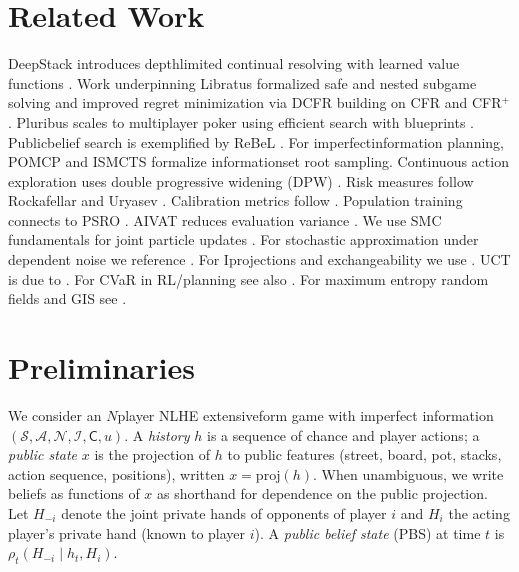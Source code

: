 \documentclass[10pt]{article}
\newcommand{\States}{\mathcal{S}}
\newcommand{\Actions}{\mathcal{A}}
\newcommand{\IS}{\mathcal{I}}
\newcommand{\Players}{\mathcal{N}}
\newcommand{\Chance}{\mathsf{C}}
\newcommand{\1}{\mathbf{1}}
\theoremstyle{plain}
\begin{document}
\section{Related Work}
DeepStack introduces depth\textendash limited continual re\textendash solving with learned value functions \citep{moravcik2017deepstack}. Work underpinning Libratus formalized safe and nested subgame solving \citep{brown2018safe} and improved regret minimization via DCFR \citep{brown2019dcfr} building on CFR \citep{zinkevich2007cfr} and CFR$^+$ \citep{tammelin2014cfrplus}. Pluribus scales to multiplayer poker using efficient search with blueprints \citep{brown2019pluribus}. Public\textendash belief search is exemplified by ReBeL \citep{brown2020rebel}. For imperfect\textendash information planning, POMCP \citep{silver2010pomcp} and ISMCTS \citep{cowling2012ismcts} formalize information\textendash set root sampling. Continuous action exploration uses double progressive widening (DPW) \citep{couetoux2011dpw}. Risk measures follow Rockafellar and Uryasev \citep{rockafellar2000cvar}. Calibration metrics follow \citet{guo2017calibration}. Population training connects to PSRO \citep{lanctot2017psro}. AIVAT reduces evaluation variance \citep{burch2018aivat}. We use SMC fundamentals for joint particle updates \citep{doucet2001smc}. For stochastic approximation under dependent noise we reference \citet{borkar2008sa}. For I\textendash projections and exchangeability we use \citet{csiszar1975i,diaconis1980finite}. UCT is due to \citet{kocsis2006uct}. For CVaR in RL/planning see also \citet{chow2014cvar,tamar2015cvar}. For maximum entropy random fields and GIS see \citet{dellarfield1997pami}.

\section{Preliminaries}
We consider an $N$\textendash player NLHE extensive\textendash form game with imperfect information $(\States,\Actions,\Players,\IS,\Chance,u)$. A \emph{history} $h$ is a sequence of chance and player actions; a \emph{public state} $x$ is the projection of $h$ to public features (street, board, pot, stacks, action sequence, positions), written $x=\mathrm{proj}(h)$. When unambiguous, we write beliefs as functions of $x$ as shorthand for dependence on the public projection. Let $H_{-i}$ denote the joint private hands of opponents of player $i$ and $H_i$ the acting player's private hand (known to player $i$). A \emph{public belief state} (PBS) at time $t$ is $\rho_t(H_{-i}\mid h_t,H_i)$.
\end{document}

